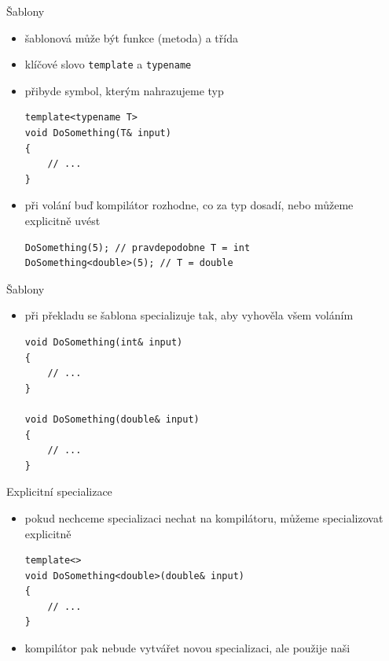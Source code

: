 \documentclass{beamer}
\begin{document}
\begin{xframe}{Šablony}
	\begin{itemize}
		\item šablonová může být funkce (metoda) a třída
		\item klíčové slovo \texttt{template} a \texttt{typename}
		\item přibyde symbol, kterým nahrazujeme typ
\begin{lstlisting}[basicstyle=\fontsize{8}{9}\selectfont\ttfamily]
template<typename T>
void DoSomething(T& input)
{
    // ...
}
\end{lstlisting}
		\item při volání buď kompilátor rozhodne, co za typ dosadí, nebo můžeme explicitně uvést
\begin{lstlisting}[basicstyle=\fontsize{8}{9}\selectfont\ttfamily]
DoSomething(5); // pravdepodobne T = int
DoSomething<double>(5); // T = double
\end{lstlisting}
	\end{itemize}
\end{xframe}

\begin{xframe}{Šablony}
	\begin{itemize}
		\item při překladu se šablona specializuje tak, aby vyhověla všem voláním
\begin{lstlisting}[basicstyle=\fontsize{8}{9}\selectfont\ttfamily]
void DoSomething(int& input)
{
    // ...
}

void DoSomething(double& input)
{
    // ...
}
\end{lstlisting}
	\end{itemize}
\end{xframe}

\begin{xframe}{Explicitní specializace}
	\begin{itemize}
		\item pokud nechceme specializaci nechat na kompilátoru, můžeme specializovat explicitně
\begin{lstlisting}[basicstyle=\fontsize{8}{9}\selectfont\ttfamily]
template<>
void DoSomething<double>(double& input)
{
    // ...
}
\end{lstlisting}
		\item kompilátor pak nebude vytvářet novou specializaci, ale použije naši
	\end{itemize}
\end{xframe}
\end{document}
